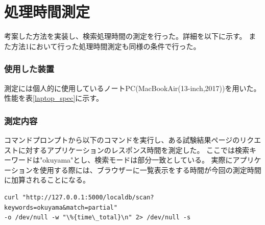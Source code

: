 
\clearpage
\section{処理時間測定} \label{sec:search_process_time_mes}

考案した方法を実装し、検索処理時間の測定を行った。詳細を以下に示す。
また方法1において行った処理時間測定も同様の条件で行った。

\subsubsection{使用した装置}

測定には個人的に使用しているノートPC(MacBookAir(13-inch,2017))を用いた。
性能を表\ref{laptop_spec}に示す。

\begin{table}[tbp]
\caption[測定に使用したノートPCの性能]{測定に使用したノートPC(MacBookAir(13-inch,2017))の性能。検索処理時間の測定に個人的に使用しているノートPCを使用した。}
\label{laptop_spec}
\end{table}

\subsubsection{測定内容}

コマンドプロンプトから以下のコマンドを実行し、ある試験結果ページのリクエストに対するアプリケーションのレスポンス時間を測定した。
ここでは検索キーワードは"okuyama"とし、検索モードは部分一致としている。
実際にアプリケーションを使用する際には、ブラウザーに一覧表示をする時間が今回の測定時間に加算されることになる。

{ \small
\begin{lstlisting}
curl "http://127.0.0.1:5000/localdb/scan?keywords=okuyama&match=partial" 
-o /dev/null -w "\%{time\_total}\n" 2> /dev/null -s
\end{lstlisting}
}

